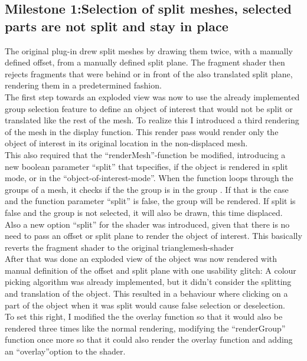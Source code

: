 \subsection{Milestone 1:Selection of split meshes, selected parts are not split and stay in place} The original plug-in drew split meshes by drawing them twice, with a manually defined offset, from a manually defined split plane. The fragment shader then rejects fragments that were behind or in front of the also translated split plane, rendering them in a predetermined fashion.\\
The first step towards an exploded view was now to use the already implemented group selection feature to define an object of interest that would not be split or translated like the rest of the mesh. To realize this I introduced a third rendering of the mesh in the display function. This render pass would render only the object of interest in its original location in the non-displaced mesh.\\
This also required that the ``renderMesh''-function be modified, introducing a new boolean parameter ``split'' that tspecifies, if the object is rendered in split mode, or in the ``object-of-interest-mode''. When the function loops through the groups of a mesh, it checks if the the group is in the group . If that is the case and the function parameter ``split'' is false, the group will be rendered. If split is false and the group is not selected, it will also be drawn, this time displaced.\\
Also a new option ``split'' for the shader was introduced, given that there is no need to pass an offset or split plane to render the object of interest. This basically reverts the fragment shader to the original trianglemesh-shader\\
After that was done an exploded view of the object was now rendered with manual definition of the offset and split plane with one usability glitch: A colour picking algorithm was already implemented, but it didn't consider the splitting and translation of the object. This resulted in a behaviour where clicking on a part of the object when it was split would cause false selection or deselection. \\
To set this right, I modified the the overlay function so that it would also be rendered three times like the normal rendering, modifying the ``renderGroup'' function once more  so that it could also render the overlay function and adding an ``overlay''option to the shader.
